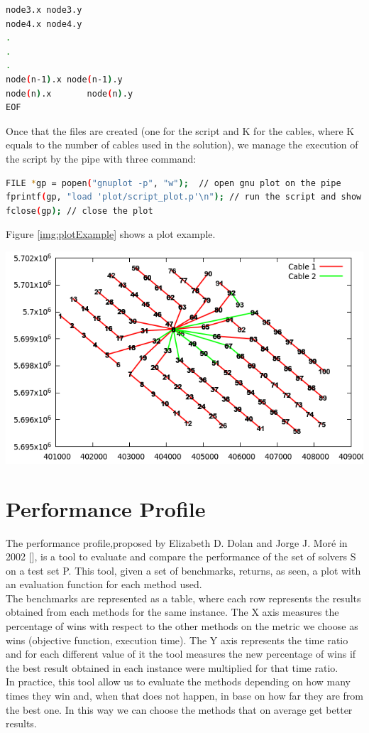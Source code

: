 \begin{appendices}
\begin{lstlisting}[language=bash,caption={Data file containing cables}]
node3.x	node3.y
node4.x	node4.y
.
.
.
node(n-1).x	node(n-1).y
node(n).x		node(n).y
EOF
\end{lstlisting}
Once that the files are created (one for the script and K for the cables, where K equals to the number of cables used in the solution), we manage the execution of the script by the pipe with three command:
\begin{lstlisting}[language=bash,caption={Script execution}]
FILE *gp = popen("gnuplot -p", "w");  // open gnu plot on the pipe 
fprintf(gp, "load 'plot/script_plot.p'\n"); // run the script and show the plot
fclose(gp); // close the plot
\end{lstlisting}
Figure \ref{img:plotExample} shows a plot example. 
\begin{center}
	\includegraphics[scale=0.5]{Graphics/plot.png}
	\label{img:plotExample}
\end{center}



\chapter{Performance Profile}
The performance profile,proposed by Elizabeth D. Dolan and Jorge J. Moré in 2002 [\cite{dolan2002benchmarking}], is a tool to evaluate and compare the performance of the set of solvers S on a test set P. This tool, given a set of benchmarks, returns, as seen, a plot with an evaluation function for each method used.\\
The benchmarks are represented as a table, where each row represents the results obtained from each methods for the same instance.
The X axis measures the percentage of wins with respect to the other methods on the metric we choose as wins (objective function, execution time). The Y axis represents the time ratio and for each different value of it the tool measures the new percentage of wins if the best result obtained in each instance were multiplied for that time ratio.\\
In practice, this tool allow us to evaluate the methods depending on how many times they win and, when that does not happen, in base on how far they are from the best one. In this way we can choose the methods that on average get better results.


\end{appendices}
